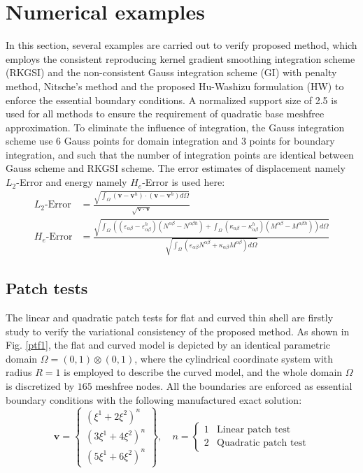 
\section{Numerical examples}\label{examples}
In this section, several examples are carried out to verify proposed method, which employs the consistent reproducing kernel gradient smoothing integration scheme (RKGSI) and the non-consistent Gauss integration scheme (GI) with penalty method, Nitsche's method and the proposed Hu-Washizu formulation (HW) to enforce the essential boundary conditions. A normalized support size of 2.5 is used for all methods to ensure the requirement of quadratic base meshfree approximation. To eliminate the influence of integration, the Gauss integration scheme use 6 Gauss points for domain integration and 3 points for boundary integration, and such that the number of integration points are identical between Gauss scheme and RKGSI scheme. The error estimates of displacement namely $L_2$-Error and energy namely $H_e$-Error is used here:
\begin{equation}
\begin{split}
L_2\text{-Error} &= \frac{\sqrt{\int_\Omega(\boldsymbol v - \boldsymbol v^h) \cdot (\boldsymbol v - \boldsymbol v^h)d\Omega}}{\sqrt{\boldsymbol v \cdot \boldsymbol v}} \\
H_e\text{-Error} &= \frac{\sqrt{\int_\Omega \left ((\varepsilon_{\alpha\beta} - \varepsilon_{\alpha\beta}^h)(N^{\alpha\beta} - N^{\alpha\beta h}) + \int_\Omega(\kappa_{\alpha\beta}-\kappa_{\alpha\beta}^h)(M^{\alpha\beta}-M^{\alpha\beta h}) \right )d\Omega}}{\sqrt{\int_\Omega(\varepsilon_{\alpha\beta}N^{\alpha\beta} + \kappa_{\alpha\beta}M^{\alpha\beta})d\Omega}}
\end{split}
\end{equation}

\subsection{Patch tests}
The linear and quadratic patch tests for flat and curved thin shell are firstly study to verify the variational consistency of the proposed method. As shown in Fig. \ref{ptf1}, the flat and curved model is depicted by an identical parametric domain $\Omega = (0,1)\otimes(0,1)$, where the cylindrical coordinate system with radius $R=1$ is employed to describe the curved model, and the whole domain $\Omega$ is discretized by $165$ meshfree nodes. All the boundaries are enforced as essential boundary conditions with the following manufactured exact solution:
\begin{equation}
\boldsymbol v = \begin{Bmatrix}
(\xi^1+2\xi^2)^n \\ (3\xi^1+4\xi^2)^n \\ (5\xi^1+6\xi^2)^n
\end{Bmatrix},\quad
n = \begin{cases}
1 & \text{Linear patch test} \\
2 & \text{Quadratic patch test}
\end{cases}
\end{equation}

